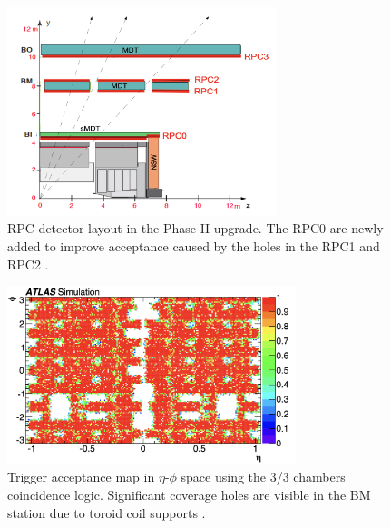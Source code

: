 \begin{figure}[htbp]
  \centering
  \includegraphics[width=0.7\textwidth]{figs/chapter4/RPC_detector_structure.png}
  \caption{RPC detector layout in the Phase-II upgrade. The RPC0 are newly added to improve acceptance caused by the holes in the RPC1 and RPC2 \cite{TDAQ_TDR}.}
  \label{fig:RPC_structure_upgrade}
\end{figure}



\begin{figure}[htbp]
  \centering
  \includegraphics[width=0.75\textwidth]{figs/chapter4/trigger_acceptance_map_3_3.png}
  \caption{Trigger acceptance map in $\eta$-$\phi$ space using the 3/3 chambers coincidence logic. Significant coverage holes are visible in the BM station due to toroid coil supports \cite{TDAQ_TDR}.}
  \label{fig:trigger_acceptance_3_3}
\end{figure}

